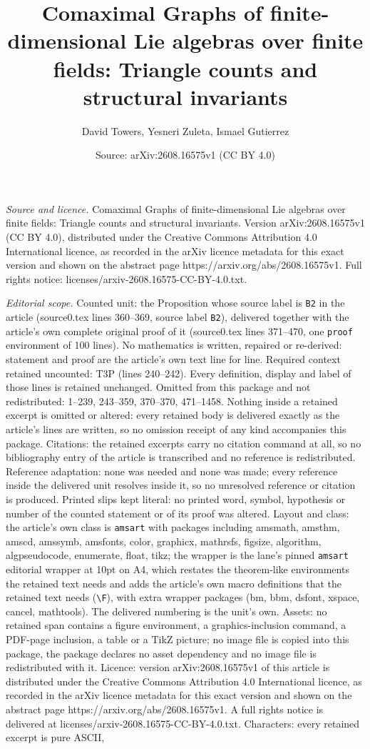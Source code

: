 \documentclass[10pt,a4paper]{amsart}
\title[Comaximal Graphs of finite-dimensional Lie algebras over fin]{Comaximal Graphs of finite-dimensional Lie algebras over finite fields: Triangle counts and structural invariants}
\author{David Towers, Yesneri Zuleta, Ismael Gutierrez}
\date{Source: arXiv:2608.16575v1 (CC BY 4.0)}
\begin{document}
\maketitle

\noindent\emph{Source and licence.} Comaximal Graphs of finite-dimensional Lie algebras over finite fields: Triangle counts and structural invariants. Version arXiv:2608.16575v1 (CC BY 4.0), distributed under the Creative Commons Attribution 4.0 International licence, as recorded in the arXiv licence metadata for this exact version and shown on the abstract page https://arxiv.org/abs/2608.16575v1. Full rights notice: licenses/arxiv-2608.16575-CC-BY-4.0.txt.\par\smallskip

\noindent\textit{Editorial scope.} Counted unit: the Proposition whose source label is \texttt{B2} in the article (source0.tex lines 360--369, source label \texttt{B2}), delivered together with the article's own complete original proof of it (source0.tex lines 371--470, one \texttt{proof} environment of 100 lines). No mathematics is written, repaired or re-derived: statement and proof are the article's own text line for line. Required context retained uncounted: T3P (lines 240--242). Every definition, display and label of those lines is retained unchanged. Omitted from this package and not redistributed: 1--239, 243--359, 370--370, 471--1458. Nothing inside a retained excerpt is omitted or altered: every retained body is delivered exactly as the article's lines are written, so no omission receipt of any kind accompanies this package. Citations: the retained excerpts carry no citation command at all, so no bibliography entry of the article is transcribed and no reference is redistributed. Reference adaptation: none was needed and none was made; every reference inside the delivered unit resolves inside it, so no unresolved reference or citation is produced. Printed slips kept literal: no printed word, symbol, hypothesis or number of the counted statement or of its proof was altered. Layout and class: the article's own class is \texttt{amsart} with packages including amsmath, amsthm, amscd, amssymb, amsfonts, color, graphicx, mathrsfs, figsize, algorithm, algpseudocode, enumerate, float, tikz; the wrapper is the lane's pinned \texttt{amsart} editorial wrapper at 10pt on A4, which restates the theorem-like environments the retained text needs and adds the article's own macro definitions that the retained text needs (\texttt{\textbackslash F}), with extra wrapper packages (bm, bbm, dsfont, xspace, cancel, mathtools). The delivered numbering is the unit's own. Assets: no retained span contains a figure environment, a graphics-inclusion command, a PDF-page inclusion, a table or a TikZ picture; no image file is copied into this package, the package declares no asset dependency and no image file is redistributed with it. Licence: version arXiv:2608.16575v1 of this article is distributed under the Creative Commons Attribution 4.0 International licence, as recorded in the arXiv licence metadata for this exact version and shown on the abstract page https://arxiv.org/abs/2608.16575v1. A full rights notice is delivered at licenses/arxiv-2608.16575-CC-BY-4.0.txt. Characters: every retained excerpt is pure ASCII, 
\end{document}
